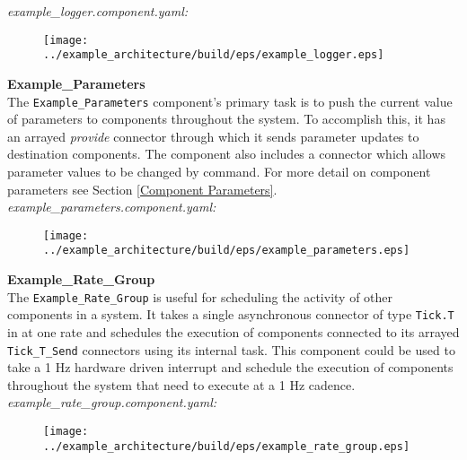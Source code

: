 \textit{example\_logger.component.yaml:}

\begin{figure}[H]
  \texttt{[image: ../example\_architecture/build/eps/example\_logger.eps]}
\end{figure}

\textbf{Example\_Parameters} \\

The \texttt{Example\_Parameters} component's primary task is to push the current value of parameters to components throughout the system. To accomplish this, it has an arrayed \textit{provide} connector through which it sends parameter updates to destination components. The component also includes a connector which allows parameter values to be changed by command. For more detail on component parameters see Section \ref{Component Parameters}. \\

\textit{example\_parameters.component.yaml:}

\begin{figure}[H]
  \texttt{[image: ../example\_architecture/build/eps/example\_parameters.eps]}
\end{figure}

\textbf{Example\_Rate\_Group} \\

The \texttt{Example\_Rate\_Group} is useful for scheduling the activity of other components in a system. It takes a single asynchronous connector of type \texttt{Tick.T} in at one rate and schedules the execution of components connected to its arrayed \texttt{Tick\_T\_Send} connectors using its internal task. This component could be used to take a 1 Hz hardware driven interrupt and schedule the execution of components throughout the system that need to execute at a 1 Hz cadence. \\

\textit{example\_rate\_group.component.yaml:}

\begin{figure}[H]
  \texttt{[image: ../example\_architecture/build/eps/example\_rate\_group.eps]}
\end{figure}

